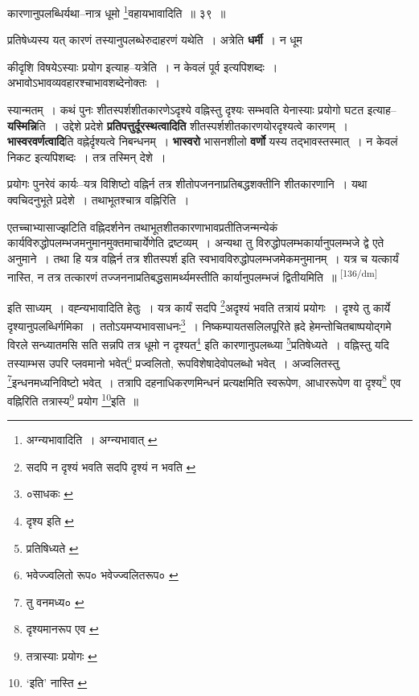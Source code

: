 \documentclass[article,12pt,a4paper]{memoir}
\begin{document}
	  \pstart कारणानुपलब्धिर्यथा--नात्र धूमो \footnote{अग्न्यभावादिति । \cite{dp-msB} \cite{dp-msD} \cite{dp-edP} \cite{dp-edH} \cite{dp-edN} अग्न्यभावात् \cite{dp-edE}}वहायभावादिति ॥ ३९ ॥
	\pend
       

	  \pstart प्रतिषेध्यस्य यत् कारणं तस्यानुपलब्धेरुदाहरणं यथेति । अत्रेति \textbf{धर्मी} । न धूम
	\pend
      

	  \pstart कीदृशि विषयेऽस्याः प्रयोग इत्याह--यत्रेति । न केवलं पूर्व इत्यपिशब्दः । अभावोऽभावव्यवहारश्चाभावशब्देनोक्तः ।
	\pend
      

	  \pstart स्यान्मतम् । कथं पुनः शीतस्पर्शशीतकारणेऽदृश्ये वह्निस्तु दृश्यः सम्भवति येनास्याः प्रयोगो घटत इत्याह--\textbf{यस्मिन्नि}ति । उद्देशे प्रदेशे \textbf{प्रतिपत्तुर्दूरस्थत्वादिति} शीतस्पर्शशीतकारणयोरदृश्यत्वे कारणम् । \textbf{भास्वरवर्णत्वादि}ति वह्नेर्दृश्यत्वे निबन्धनम् । \textbf{भास्वरो} भासनशीलो \textbf{वर्णो} यस्य तद्भावस्तस्मात् । न केवलं निकट इत्यपिशब्दः । तत्र तस्मिन् देशे ।
	\pend
      

	  \pstart प्रयोगः पुनरेवं कार्यः--यत्र विशिष्टो वह्निर्न तत्र शीतोपजननाप्रतिबद्धशक्तीनि शीतकारणानि । यथा क्वचिदनुभूते प्रदेशे । तथाभूतश्चात्र वह्निरिति ।
	\pend
      

	  \pstart एतच्चाभ्यासाज्झटिति वह्निदर्शनेन तथाभूतशीतकारणाभावप्रतीतिजन्मन्येकं कार्यविरुद्धोपलम्भजमनुमानमुक्तमाचार्येणेति द्रष्टव्यम् । अन्यथा तु विरुद्धोपलम्भकार्यानुपलम्भजे द्वे एते अनुमाने । तथा हि यत्र वह्निर्न तत्र शीतस्पर्श इति स्वभावविरुद्धोपलम्भजमेकमनुमानम् । यत्र च यत्कार्यं नास्ति, न तत्र तत्कारणं तज्जननाप्रतिबद्धसामर्थ्यमस्तीति कार्यानुपलम्भजं द्वितीयमिति ॥
	\pend
      \leavevmode\textsuperscript{\rmlatinfont\tiny [136/dm]}

	  \pstart इति साध्यम् । वह्न्यभावादिति हेतुः । यत्र कार्यं सदपि \footnote{सदपि न दृश्यं भवति \cite{dp-msC} सदपि दृश्यं न भवति \cite{dp-msA} \cite{dp-edP} \cite{dp-edH} \cite{dp-edE} \cite{dp-edN}}अदृश्यं भवति तत्रायं प्रयोगः । दृश्ये तु कार्ये दृश्यानुपलब्धिर्गमिका । ततोऽयमप्यभावसाधनः\footnote{०साधकः \cite{dp-msC}} । निष्कम्पायतसलिलपूरिते ह्रदे हेमन्तोचितबाष्पयोद्गमे विरले सन्ध्यातमसि सति सन्नपि तत्र धूमो न दृश्यत\footnote{दृश्य इति \cite{dp-msA} \cite{dp-edP} \cite{dp-edH} \cite{dp-edE} \cite{dp-edN}} इति कारणानुपलब्ध्या \footnote{प्रतिषिध्यते \cite{dp-msB}}प्रतिषेध्यते । वह्निस्तु यदि तस्याम्भस उपरि प्लवमानो भवेत्\footnote{भवेज्ज्वलितो रूप० \cite{dp-msA} \cite{dp-edP} \cite{dp-edH} \cite{dp-edN} भवेज्ज्वलितरूप० \cite{dp-edE}} प्रज्वलितो, रूपविशेषादेवोपलब्धो भवेत् । अज्वलितस्तु \footnote{तु वनमध्य० \cite{dp-msB}}इन्धनमध्यनिविष्टो भवेत् । तत्रापि दहनाधिकरणमिन्धनं प्रत्यक्षमिति स्वरूपेण, आधाररूपेण वा दृश्य\footnote{दृश्यमानरूप एव \cite{dp-msC}} एव वह्निरिति तत्रास्य\footnote{तत्रास्याः प्रयोगः \cite{dp-msA} \cite{dp-msB} \cite{dp-msC} \cite{dp-msD} \cite{dp-edP} \cite{dp-edH} \cite{dp-edE} \cite{dp-edN}} प्रयोग \footnote{‘इति’ नास्ति \cite{dp-msA} \cite{dp-msB} \cite{dp-edP} \cite{dp-edH} \cite{dp-edE} \cite{dp-edN}}इति ॥
	\pend
      
\end{document}
